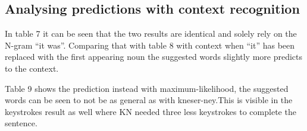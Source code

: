 \subsection{Analysing predictions with context recognition}
In table 7 it can be seen that the two results are identical and solely rely on the N-gram “it was”. Comparing that with table 8 with context when “it” has been replaced with the first appearing noun the suggested words slightly more predicts to the context.

Table 9 shows the prediction instead with maximum-likelihood, the suggested words can be seen to not be as general as with kneser-ney.This is visible in the keystrokes result as well where KN needed three less keystrokes to complete the sentence.